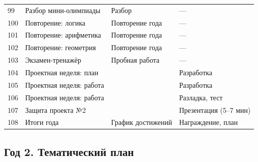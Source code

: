 \documentclass[12pt,a4paper]{article}
\begin{document}
\begin{longtable}{C{1.0cm}L{4.4cm}L{4.0cm}L{4.4cm}}
99 & Разбор мини-олимпиады & Разбор &  ---\\
100 & Повторение: логика & Повторение года &  ---\\
101 & Повторение: арифметика & Повторение года &  ---\\
102 & Повторение: геометрия & Повторение года &  ---\\
103 & Экзамен-тренажёр & Пробная работа &  ---\\
104 & Проектная неделя: план & &  Разработка\\
105 & Проектная неделя: работа & &  Разработка\\
106 & Проектная неделя: работа & &  Разладка, тест\\
107 & Защита проекта №2 & &  Презентация (5--7 мин)\\
108 & Итоги года & График достижений &  Награждение, план\\
\bottomrule
\end{longtable}

\subsection{Год 2. Тематический план}
\end{document}
